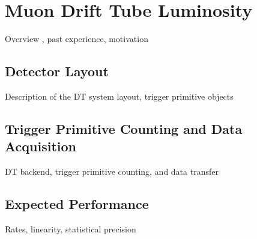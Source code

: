 \chapter{Muon Drift Tube Luminosity}

Overview , past experience, motivation

\section{Detector Layout}
Description of the DT system layout, trigger primitive objects

\section{Trigger Primitive Counting and Data Acquisition}
DT backend, trigger primitive counting, and  data transfer

\section{Expected Performance}
Rates, linearity, statistical precision

